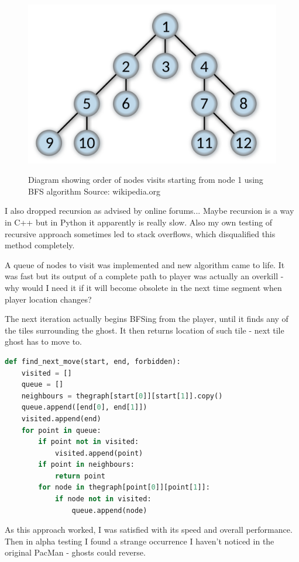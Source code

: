 \documentclass[11pt,a4paper,notitlepage]{report}
\newenvironment{img}{
	\begin{center}
		\begin{figure}[H]
			\begin{center}
			
}{
	\end{center}
		\end{figure}
			\end{center}
}
\begin{document}
					\begin{img}
						\includegraphics[width=350pt]{images/bfs-diagram}\\
						\caption{Diagram showing order of nodes visits starting from node 1 using BFS algorithm Source: wikipedia.org}
					\end{img}
					
					I also dropped recursion as advised by online forums... Maybe recursion is a way in C++ but in Python it apparently is really slow. Also my own testing of recursive approach sometimes led to stack overflows, which disqualified this method completely.
					
					A queue of nodes to visit was implemented and new algorithm came to life. It was fast but its output of a complete path to player was actually an overkill - why would I need it if it will become obsolete in the next time segment when player location changes?
					
					The next iteration actually begins BFSing from the player, until it finds any of the tiles surrounding the ghost. It then returns location of such tile - next tile ghost has to move to.
					
					\begin{lstlisting}[language=Python]
def find_next_move(start, end, forbidden):
	visited = []
	queue = []
	neighbours = thegraph[start[0]][start[1]].copy()
	queue.append([end[0], end[1]])
	visited.append(end)
	for point in queue:
		if point not in visited:
			visited.append(point)
		if point in neighbours:
			return point
		for node in thegraph[point[0]][point[1]]:
			if node not in visited:
				queue.append(node)
					\end{lstlisting}
					
					As this approach worked, I was satisfied with its speed and overall performance. Then in alpha testing I found a strange occurrence I haven't noticed in the original PacMan - ghosts could reverse.
					
\end{document}
